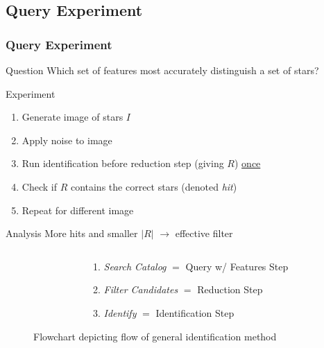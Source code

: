\documentclass[11pt]{beamer}
\begin{document}
    \subsection{Query Experiment}\label{subsec:queryExperiment}
    \begin{frame}
        \frametitle{Query Experiment}
        \begin{block}{Question}
            Which set of features most accurately distinguish a set of stars?
        \end{block}
        \begin{block}{Experiment}
            \begin{enumerate}
                \item Generate image of stars $I$
                \item Apply noise to image
                \item Run identification before reduction step (giving $R$) \underline{once}
                \item Check if $R$ contains the correct stars (denoted \textit{hit})
                \item Repeat for different image
            \end{enumerate}
        \end{block}
        \begin{block}{Analysis}
            More hits and smaller $|R|$ $\rightarrow$ effective filter
        \end{block}
    \end{frame}

    \begin{frame}
        \begin{figure}
            \begin{columns}
                \begin{column}{0.4\linewidth}
                    \centering{\scalebox{.53}{}}
                \end{column}
                \begin{column}{0.6\linewidth}
                    \caption{Flowchart depicting flow of general identification method} \bigskip
                    \begin{enumerate}
                        \item \textit{Search Catalog} $=$ Query w/ Features Step \medskip
                        \item \textit{Filter Candidates} $=$ Reduction Step \medskip
                        \item \textit{Identify} $=$ Identification Step \medskip
                    \end{enumerate}
                \end{column}
            \end{columns}
        \end{figure}
    \end{frame}
\end{document}
